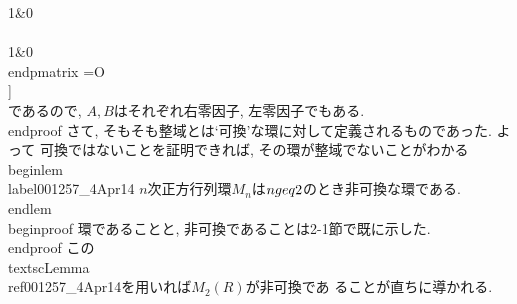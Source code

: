   1&0\\\\
  1&0
 \\end{pmatrix}
=O
\\]
\\[
 BC=
 \\begin{pmatrix}
  0&0\\\\
  1&1
 \\end{pmatrix}
 \\begin{pmatrix}
  1&-1\\\\
  -1&1
 \\end{pmatrix}
=O
\\]
 であるので, $A, B$はそれぞれ右零因子, 左零因子でもある.
 \\end{proof}
 さて, そもそも整域とは`可換'な環に対して定義されるものであった. よって
 可換ではないことを証明できれば, その環が整域でないことがわかる
 \\begin{lem}
  \\label{001257_4Apr14}
  $n$次正方行列環$M_{n}$は$n\\geq 2$のとき非可換な環である. 
 \\end{lem}
 \\begin{proof}
  環であることと, 非可換であることは2-1節で既に示した.
 \\end{proof}
 この\\textsc{Lemma}~\\ref{001257_4Apr14}を用いれば$M_{2}(R)$が非可換であ
 ることが直ちに導かれる.
 
